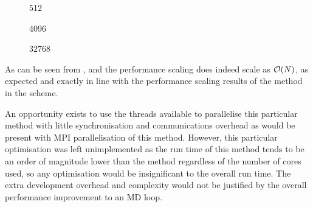 %
%
\begin{figure}[!h]
    
    \caption{
        \vOneSRTimeCaption
            {\sharedandreplicateddata{}}
            {\individualoperation{}}
            {512}
    }
    \label{fig:v1_shared_and_replicated_individual_operation_512_time}
\end  {figure}

\begin{figure}[!h]
    
    \caption{
        \vOneSRTimeCaption
            {\sharedandreplicateddata{}}
            {\individualoperation{}}
            {4096}
    }
    \label{fig:v1_shared_and_replicated_individual_operation_4096_time}
\end  {figure}

\begin{figure}[!h]
    
    \caption{
        \vOneSRTimeCaption
            {\sharedandreplicateddata{}}
            {\individualoperation{}}
            {32768}
    }
    \label{fig:v1_shared_and_replicated_individual_operation_32768_time}
\end  {figure}

\vOneSRTimeExplanation
    {}
    {}
    {}
    {\individualoperation{}}
    {\replicateddata{}}


%
As can be seen from 
,
 and
the performance scaling does indeed scale as $\mathcal{O}{\left({ N }\right)}$, as expected
and exactly in line with the performance scaling results of the
\individualoperation{} method in the \replicateddata{} scheme.

An opportunity exists to use the \openmp{} threads available to
parallelise this particular method with little synchronisation
and communications overhead as would be present with MPI
parallelisation of this method.
%
However, this particular optimisation was left unimplemented as
the run time of this method tends to be an order of magnitude
lower than the \pairoperation{} method regardless of the
number of cores used, so any optimisation
would be insignificant to the overall run time.
%
The extra development overhead and complexity would not be justified by the
overall performance improvement to an MD loop.



